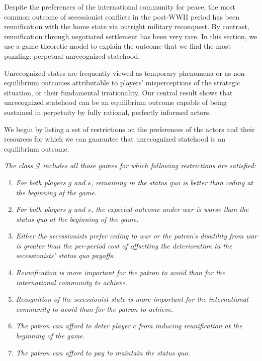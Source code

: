 Despite the preferences of the international community for peace, the most common outcome of secessionist conflicts in the post-WWII period has been reunification with the home state via outright military reconquest. By contrast, reunification through negotiated settlement has been very rare. In this section, we use a game theoretic model to explain the outcome that we find the most puzzling: perpetual unrecognized statehood.

Unrecognized states are frequently viewed as temporary phenomena or as non-equilibrium outcomes attributable to players' misperceptions of the strategic situation, or their fundamental irrationality. Our central result shows that unrecognized statehood can be an equilibrium outcome capable of being sustained in perpetuity by fully rational, perfectly informed actors. 

We begin by listing a set of restrictions on the preferences of the actors and their resources for which we can guarantee that unrecognized statehood is an equilibrium outcome.

\begin{definition}
\emph{The class $\mathcal{G}$ includes all those games for which following restrictions are satisfied:}

\begin{enumerate}
\item \textit{For both players $g$ and $s$, remaining in the status quo is better than ceding at the beginning of the game.}\label{res:1}

\item \textit{For both players $g$ and $s$, the expected outcome under war is worse than the status quo at the beginning of the game.}\label{res:2}

\item \textit{Either the secessionists prefer ceding to war or the patron's disutility from war is greater than the per-period cost of offsetting the deterioration in the secessionists' status quo payoffs.}\label{res:new}

\item \textit{Reunification is more important for the patron to avoid than for the international community to achieve.}\label{res:3}

\item  \textit{Recognition of the secessionist state is more important for the international community to avoid than for the patron to achieve.}\label{res:4}

\item  \textit{The patron can afford to deter player $c$ from inducing reunification at the beginning of the game.}\label{res:5}

\item \textit{The patron can afford to pay to maintain the status quo.}\label{res:6}

\end{enumerate}
\end{definition}


